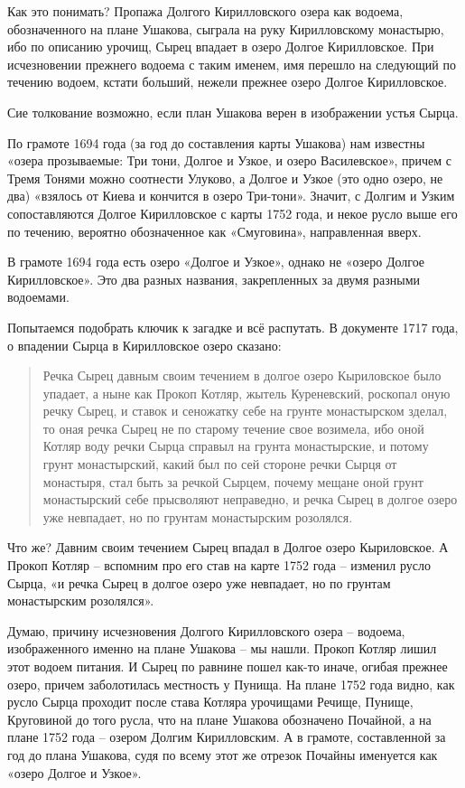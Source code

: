 Как это понимать? Пропажа Долгого Кирилловского озера как водоема, обозначенного на плане Ушакова, сыграла на руку Кирилловскому монастырю, ибо по описанию урочищ, Сырец впадает в озеро Долгое Кирилловское. При исчезновении прежнего водоема с таким именем, имя перешло на следующий по течению водоем, кстати больший, нежели прежнее озеро Долгое Кирилловское.

Сие толкование возможно, если план Ушакова верен в изображении устья Сырца.

По грамоте 1694 года (за год до составления карты Ушакова) нам известны «озера прозываемые: Три тони, Долгое и Узкое, и озеро Василевское», причем с Тремя Тонями можно соотнести Улуково, а Долгое и Узкое (это одно озеро, не два) «взялось от Киева и кончится в озеро Три-тони». Значит, с Долгим и Узким сопоставляются Долгое Кирилловское с карты 1752 года, и некое русло выше его по течению, вероятно обозначенное как «Смуговина», направленная вверх.

В грамоте 1694 года есть озеро «Долгое и Узкое», однако не «озеро Долгое Кирилловское». Это два разных названия, закрепленных за двумя разными водоемами.
 
Попытаемся подобрать ключик к загадке и всё распутать. В документе 1717 года\cite[вып. 6, стр. 59]{histmatkiev}, о впадении Сырца в Кирилловское озеро сказано:

\begin{quotation}
Речка Сырец давным своим течением в долгое озеро Кыриловское было упадает, а ныне как Прокоп Котляр, жытель Куреневский, роскопал оную речку Сырец, и ставок и сеножатку себе на грунте монастырском зделал, то оная речка Сырец не по старому течение свое возимела, ибо оной Котляр воду речки Сырца справыл на грунта монастырские, и потому грунт монастырский, какий был по сей стороне речки Сырця от монастыря, стал быть за речкой Сырцем, почему мещане оной грунт монастырский себе прысволяют неправедно, и речка Сырец в долгое озеро уже невпадает, но по грунтам монастырским розолялся.
\end{quotation}

Что же? Давним своим течением Сырец впадал в Долгое озеро Кыриловское. А Прокоп Котляр – вспомним про его став на карте 1752 года – изменил русло Сырца, «и речка Сырец в долгое озеро уже невпадает, но по грунтам монастырским розолялся».

Думаю, причину исчезновения Долгого Кирилловского озера – водоема, изображенного именно на плане Ушакова – мы нашли. Прокоп Котляр лишил этот водоем питания. И Сырец по равнине пошел как-то иначе, огибая прежнее озеро, причем заболотилась местность у Пунища. На плане 1752 года видно, как русло Сырца проходит после става Котляра урочищами Речище, Пунище, Круговиной до того русла, что на плане Ушакова обозначено Почайной, а на плане 1752 года – озером Долгим Кирилловским. А в грамоте, составленной за год до плана Ушакова, судя по всему этот же отрезок Почайны именуется как «озеро Долгое и Узкое». 

